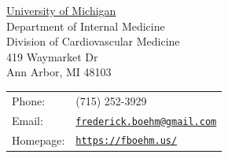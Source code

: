 
\begin{minipage}{0.45\linewidth}
  \href{https://umich.edu/}{University of Michigan} \\
  Department of Internal Medicine\\
  Division of Cardiovascular Medicine \\
  419 Waymarket Dr \\
  Ann Arbor, MI 48103
\end{minipage}
\begin{minipage}{0.45\linewidth}
  \begin{tabular}{ll}
    Phone: & (715) 252-3929 \\
    Email: & \href{mailto:frederick.boehm@gmail.com}{\tt frederick.boehm@gmail.com} \\
    Homepage: & \href{https://fboehm.us/}{\tt https://fboehm.us/} \\
  \end{tabular}
\end{minipage}
